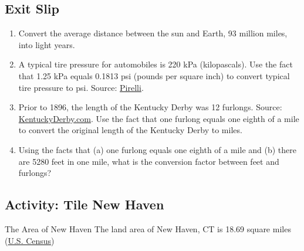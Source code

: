 \subsection{Exit Slip}
\begin{enumerate}
\item Convert the average distance between the sun and Earth, 93 million miles, into light years.\wbvfill
\item A typical tire pressure for automobiles is 220 kPa (kilopascals). Use the fact that 1.25 kPa equals 0.1813 psi (pounds per square inch) to convert typical tire pressure to psi. Source: \href{https://www.pirelli.com/tires/en-us/car/driving-and-tire-tips/how-to-read/recommended-tire-pressure}{Pirelli}.\wbvfill
\item Prior to 1896, the length of the Kentucky Derby was 12 furlongs. Source: \href{https://www.kentuckyderby.com/history/kentucky-derby-history}{KentuckyDerby.com}. Use the fact that one furlong equals one eighth of a mile to convert the original length of the Kentucky Derby to miles.\wbvfill
\item Using the facts that (a) one furlong equals one eighth of a mile and (b) there are 5280 feet in one mile, what is the conversion factor between feet and furlongs?\wbvfill
\end{enumerate}\wbnewpage

\subsection{Activity: Tile New Haven}
The Area of New Haven The land area of New Haven, CT is 18.69 square miles (\href{https://www.census.gov/quickfacts/newhavencityconnecticut}{U.S. Census})

